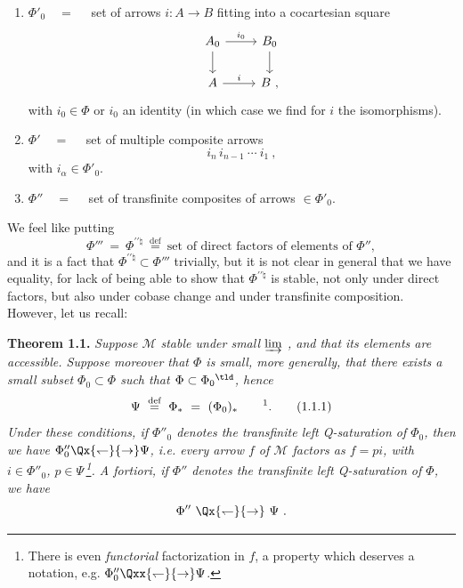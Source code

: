 \begin{enumerate}[leftmargin=*]
\item[1)] $\Phi'_0 \quad = \quad$ set of arrows $i : A \longrightarrow B$ fitting into a cocartesian square
\[
\begin{tikzcd}
A_0 \arrow[r, "i_0"] \arrow[d] & B_0 \arrow[d]\\
A \arrow[r, "i"] & B\ ,
\end{tikzcd}
\]
with $i_0 \in \Phi$ or $i_0$ an identity (in which case we find for $i$ the isomorphisms).

\item[2)] $\Phi' \quad = \quad$ set of multiple composite arrows
\[
i_n \, i_{n-1} \ \cdots \ i_1\ ,
\]
with $i_\alpha \in \Phi'_0$.

\item[3)] $\Phi'' \quad = \quad$ set of transfinite composites of arrows $\in \Phi'_0$.
\end{enumerate}

We feel like putting
\[
\Phi''' \ = \ \Phi^{\prime\prime\natural} \ \overset{\text{def}}{=} \ \text{set of direct factors of elements of } \Phi'',
\]
and it is a fact that $\Phi^{\prime\prime\natural} \subset \Phi'''$ trivially, but it is not clear in general that we have %
equality, for lack of being able to show that $\Phi^{\prime\prime\natural}$ is stable, not only under direct factors, but also under cobase change and under transfinite composition. However, let us recall:

\textbf{Theorem 1.1.} \textit{Suppose $\mathcal{M}$ stable under small $\varinjlim$ , and that its elements are accessible. Suppose moreover that $\Phi$ is small, more generally, that there exists a small subset $\Phi_0 \subset \Phi$ such that $\Phi \subset \Phi_0{}^{\tld}$, hence}
\[
\Psi \ \overset{\text{def}}{=} \ \Phi_{*} \ = \ (\Phi_0)_{*} \qquad \text{\footnotemark}.
\tag*{(1.1.1)} %
\]
\textit{Under these conditions, if $\Phi''_0$ denotes the transfinite left \textup{Q}-saturation of $\Phi_0$, then we have $\Phi''_0 \Qx{\leftharpoondown}{\rightarrow} \Psi$, i.e. every arrow $f$ of $\mathcal{M}$ factors as $f = pi$, with $i \in \Phi''_0$, $p \in \Psi$\,\footnote{There is even \textit{functorial} factorization in $f$, a property which deserves a notation, e.g. $\Phi''_0 \Qxx{\leftharpoondown}{\rightarrow} \Psi$.}. A fortiori, if $\Phi''$ denotes the transfinite left \textup{Q}-saturation of $\Phi$, we have} %
\[
\Phi'' \ \Qx{\leftharpoondown}{\rightarrow} \ \Psi\ .
\]

